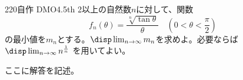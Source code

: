 \begin{thm}{220}{}{自作 DMO4.5th}
 2以上の自然数$n$に対して、関数
 \[ f_n(\theta)=\frac{\sqrt[n]{\tan\theta}}{\theta} \quad (0<\theta<\frac{\pi}{2}) \]
 の最小値を$m_n$とする。$\disp \lim_{n\to\infty} m_n$を求めよ。必要ならば$\disp \lim_{n\to\infty} n^{\frac{1}{n}}$ を用いてよい。
\end{thm}

ここに解答を記述。